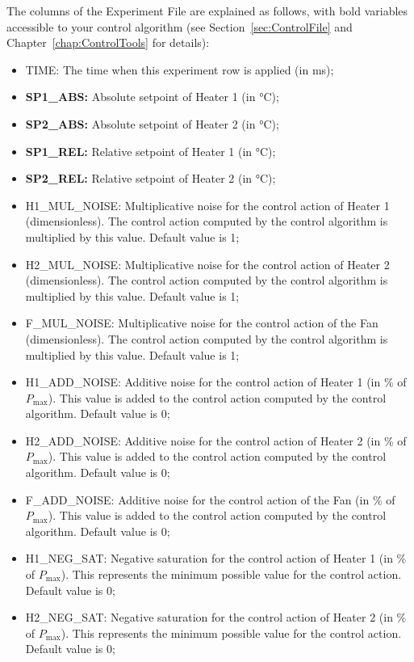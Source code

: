 \documentclass[12pt]{report}
\begin{document}
The columns of the Experiment File are explained as follows, with bold variables accessible to your control algorithm (see Section~\ref{sec:ControlFile} and Chapter~\ref{chap:ControlTools} for details):

\begin{itemize}
\item TIME: The time when this experiment row is applied (in ms);
\item \textbf{SP1\_ABS:} Absolute setpoint of Heater 1 (in °C);
\item \textbf{SP2\_ABS:} Absolute setpoint of Heater 2 (in °C);
\item \textbf{SP1\_REL:} Relative setpoint of Heater 1 (in °C);
\item \textbf{SP2\_REL:} Relative setpoint of Heater 2 (in °C);
\item H1\_MUL\_NOISE: Multiplicative noise for the control action of Heater 1 (dimensionless). The control action computed by the control algorithm is multiplied by this value. Default value is 1;
\item H2\_MUL\_NOISE: Multiplicative noise for the control action of Heater 2 (dimensionless). The control action computed by the control algorithm is multiplied by this value. Default value is 1;
\item F\_MUL\_NOISE: Multiplicative noise for the control action of the Fan (dimensionless). The control action computed by the control algorithm is multiplied by this value. Default value is 1;
\item H1\_ADD\_NOISE: Additive noise for the control action of Heater 1 (in \% of $P_{\text{max}}$). This value is added to the control action computed by the control algorithm. Default value is 0;
\item H2\_ADD\_NOISE: Additive noise for the control action of Heater 2 (in \% of $P_{\text{max}}$). This value is added to the control action computed by the control algorithm. Default value is 0;
\item F\_ADD\_NOISE: Additive noise for the control action of the Fan (in \% of $P_{\text{max}}$). This value is added to the control action computed by the control algorithm. Default value is 0;
\item H1\_NEG\_SAT: Negative saturation for the control action of Heater 1 (in \% of $P_{\text{max}}$). This represents the minimum possible value for the control action. Default value is 0;
\item H2\_NEG\_SAT: Negative saturation for the control action of Heater 2 (in \% of $P_{\text{max}}$). This represents the minimum possible value for the control action. Default value is 0;

\end{itemize}
\end{document}
